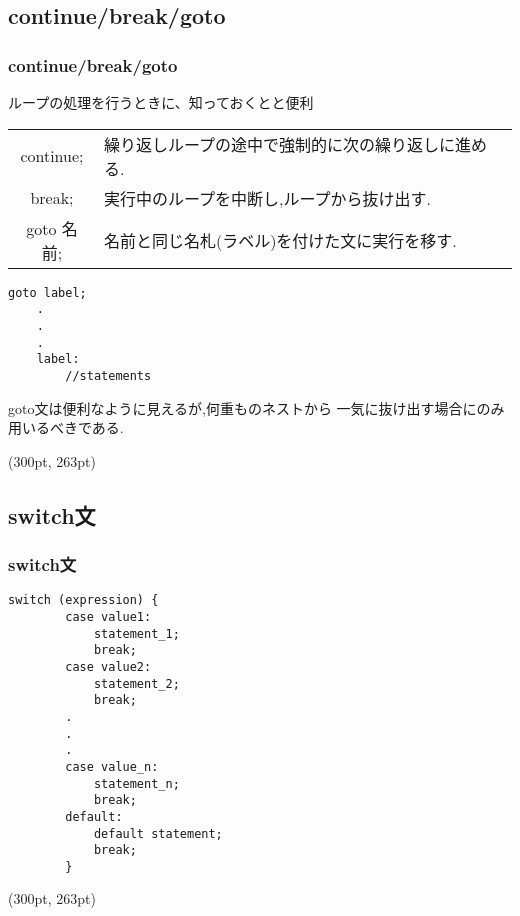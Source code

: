 \documentclass[dvipdfmx]{beamer}
\begin{document}
\subsection{continue/break/goto}
\begin{frame}[t, fragile, label=37]
    \frametitle{continue/break/goto}
    ループの処理を行うときに、知っておくとと便利
    \begin{table}
    \centering
    \begin{tabular}{cl}
        \hline
        continue; & 繰り返しループの途中で強制的に次の繰り返しに進める.\\
        break; & 実行中のループを中断し,ループから抜け出す.\\
        goto 名前; & 名前と同じ名札(ラベル)を付けた文に実行を移す.\\
        \hline
    \end{tabular}
    \end{table}
    \begin{lstlisting}[gobble=3, caption=Syntax of goto statement, label=goto_howto]
    goto label;
    .
    .
    .
    label:
        //statements
    \end{lstlisting}
    goto文は便利なように見えるが,何重ものネストから
    一気に抜け出す場合にのみ用いるべきである.
    \begin{textblock*}{0.3\linewidth}(300pt, 263pt)
    \hyperlink{36}{}
    \space
    \hyperlink{38}{}
    \end{textblock*}
\end{frame}

\subsection{switch文}
\begin{frame}[t, fragile, label=38]
    \frametitle{switch文}
    \begin{lstlisting}[gobble=6, caption=Syntax\space of\space switch\space statement, label=switch_howto]
        switch (expression) {
        case value1:
            statement_1;
            break;
        case value2:
            statement_2;
            break;
        .
        .
        .
        case value_n:
            statement_n;
            break;
        default:
            default statement;
            break;
        }
    \end{lstlisting}
    \begin{textblock*}{0.3\linewidth}(300pt, 263pt)
    \hyperlink{37}{}
    \space
    \hyperlink{39}{}
    \end{textblock*}
\end{frame}
\end{document}
